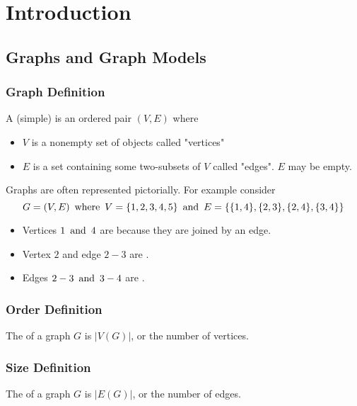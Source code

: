 \section{Introduction}

\subsection{Graphs and Graph Models}

\subsubsection*{Graph Definition}
A (simple)  is an ordered pair $(V,E)$ where
\begin{itemize}
    \item $V$ is a nonempty set of objects called "vertices"
    \item $E$ is a set containing some two-subsets of $V$ called "edges". $E$ may be empty.
\end{itemize}

Graphs are often represented pictorially. For example consider
\[
    G = (V,E) \operatorname{~\text{where}~} V = \{1,2,3,4,5\} \operatorname{~\text{and}~} E = \{\{1,4\},\{2,3\},\{2,4\},\{3,4\}\}
\]

\begin{center}
\end{center}
\begin{itemize}
\item Vertices $1 \operatorname{~\text{and}~} 4$ are  because they are joined by an edge.
    \item Vertex $2$ and edge $2-3$ are .
    \item Edges $2-3 \operatorname{~\text{and}~} 3-4$ are .
\end{itemize}

\subsubsection*{Order Definition}
The  of a graph $G$ is $|V(G)|$, or the number of vertices.

\subsubsection*{Size Definition}
The  of a graph $G$ is $|E(G)|$, or the number of edges.